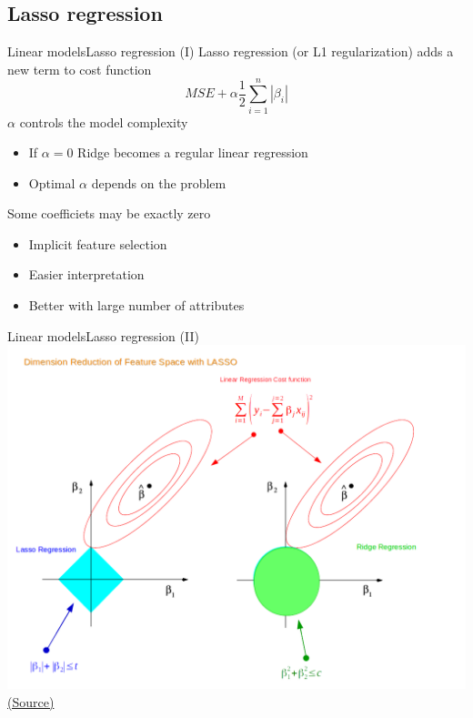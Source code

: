 \documentclass[10pt,compress]{beamer} %
\begin{document}
\subsection{Lasso regression}
\begin{frame}{Linear models}{Lasso regression (I)}
	Lasso regression (or L1 regularization) adds a new term to cost function
    \begin{equation*}
        MSE + \alpha \frac{1}{2} \sum_{i=1}^n |\beta_i|
    \end{equation*}
    $\alpha$ controls the model complexity
	\begin{itemize}
		\item If $\alpha = 0$ Ridge becomes a regular linear regression
        \item Optimal $\alpha$ depends on the problem
	\end{itemize}

    Some coefficiets may be exactly zero
    \begin{itemize}
        \item Implicit feature selection
        \item Easier interpretation
        \item Better with large number of attributes
    \end{itemize}
\end{frame}

\begin{frame}{Linear models}{Lasso regression (II)}
    \centering \includegraphics[width=0.7\linewidth]{figs/lasso-ridge.png}\\
    \tiny{\href{https://towardsdatascience.com/ridge-and-lasso-regression-a-complete-guide-with-python-scikit-learn-e20e34bcbf0b}{(Source)}}
\end{frame}
\end{document}
